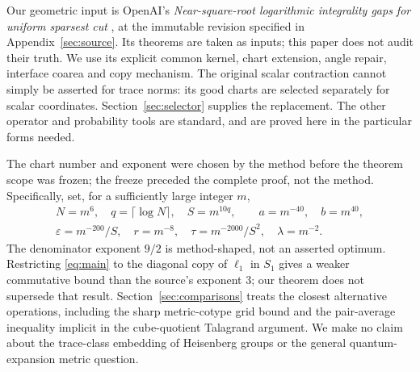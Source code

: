 \documentclass[11pt]{article}
\theoremstyle{remark}\newtheorem{remark}[theorem]{Remark}
\numberwithin{equation}{section}
\begin{document}
Our geometric input is OpenAI's \emph{Near-square-root logarithmic
integrality gaps for uniform sparsest cut} \cite{source}, at the immutable
revision specified in Appendix~\ref{sec:source}. Its theorems are taken as
inputs; this paper does not audit their truth. We use its explicit common
kernel, chart extension, angle repair, interface coarea and copy mechanism.
The original scalar contraction cannot simply be asserted for trace
norms: its good charts are selected separately for scalar coordinates.
Section~\ref{sec:selector} supplies the replacement. The other operator
and probability tools are standard, and are proved here in the particular
forms needed.

The chart number and exponent were chosen by the method before the theorem
scope was frozen; the freeze preceded the complete proof, not the method.
Specifically, set, for a sufficiently large integer $m$,
\begin{equation}\label{eq:parameters}
\begin{gathered}
 N=m^6,\quad q=\lceil\log N\rceil,\quad S=m^{10q},\qquad
 a=m^{-40},\quad b=m^{40},\\
 \varepsilon=m^{-200}/S,\quad r=m^{-8},\quad
 \tau=m^{-2000}/S^2,\quad \lambda=m^{-2}.
\end{gathered}
\end{equation}
The denominator exponent $9/2$ is method-shaped, not an asserted optimum.
Restricting \eqref{eq:main} to the diagonal copy of $\ell_1$ in $S_1$ gives
a weaker commutative bound than the source's exponent $3$; our theorem
does not supersede that result. Section~\ref{sec:comparisons} treats the
closest alternative operations, including the sharp metric-cotype grid
bound and the pair-average inequality implicit in the cube-quotient
Talagrand argument. We make no claim about the trace-class embedding of
Heisenberg groups or the general quantum-expansion metric question.
\end{document}
